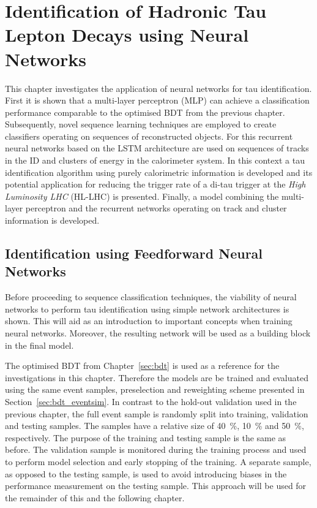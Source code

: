 \chapter{Identification of Hadronic Tau Lepton Decays using Neural Networks}
\label{sec:rnn}

This chapter investigates the application of neural networks for tau
identification. First it is shown that a multi-layer perceptron (MLP) can
achieve a classification performance comparable to the optimised BDT from the
previous chapter. Subsequently, novel sequence learning techniques are employed
to create classifiers operating on sequences of reconstructed objects. For this
recurrent neural networks based on the LSTM architecture are used on sequences
of tracks in the ID and clusters of energy in the calorimeter system. In this
context a tau identification algorithm using purely calorimetric information is
developed and its potential application for reducing the trigger rate of a
di-tau trigger at the \emph{High Luminosity LHC} (HL-LHC) is presented. Finally,
a model combining the multi-layer perceptron and the recurrent networks
operating on track and cluster information is developed.

\section{Identification using Feedforward Neural Networks}
\label{sec:ffnn_id}

Before proceeding to sequence classification techniques, the viability of neural
networks to perform tau identification using simple network architectures is
shown. This will aid as an introduction to important concepts when training
neural networks. Moreover, the resulting network will be used as a building
block in the final model.

The optimised BDT from Chapter~\ref{sec:bdt} is used as a reference for the
investigations in this chapter. Therefore the models are be trained and
evaluated using the same event samples, preselection and reweighting scheme
presented in Section~\ref{sec:bdt_eventsim}. In contrast to the hold-out
validation used in the previous chapter, the full event sample is randomly split
into training, validation and testing samples. The samples have a relative size
of \SI{40}{\percent}, \SI{10}{\percent} and \SI{50}{\percent}, respectively. The
purpose of the training and testing sample is the same as before. The validation
sample is monitored during the training process and used to perform model
selection and early stopping of the training. A separate sample, as opposed to
the testing sample, is used to avoid introducing biases in the performance
measurement on the testing sample. This approach will be used for the remainder
of this and the following chapter.


